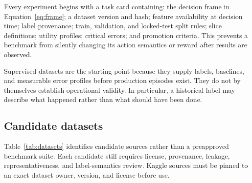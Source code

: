 \documentclass[conference]{IEEEtran}
\begin{document}
Every experiment begins with a task card containing: the decision
frame in Equation~\ref{eq:frame}; a dataset version and hash; feature
availability at decision time; label provenance; train, validation,
and locked-test split rules; slice definitions; utility profiles;
critical errors; and promotion criteria. This prevents a benchmark
from silently changing its action semantics or reward after results
are observed.

Supervised datasets are the starting point because they supply labels,
baselines, and measurable error profiles before production episodes
exist. They do not by themselves establish operational validity. In
particular, a historical label may describe what happened rather than
what should have been done.

\subsection{Candidate datasets}

Table~\ref{tab:datasets} identifies candidate sources rather than a
preapproved benchmark suite. Each candidate still requires license,
provenance, leakage, representativeness, and label-semantics review.
Kaggle sources must be pinned to an exact dataset owner, version, and
license before use.
\end{document}
